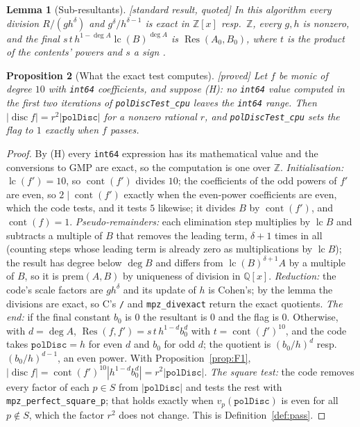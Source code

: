 \documentclass[10pt,a4paper]{article}
\newcommand{\Z}{\mathbb{Z}}
\newcommand{\Q}{\mathbb{Q}}
\DeclareMathOperator{\Res}{Res}
\DeclareMathOperator{\disc}{disc}
\DeclareMathOperator{\lc}{lc}
\DeclareMathOperator{\cont}{cont}
\newcommand{\code}[1]{\texttt{#1}}
\newcommand{\stproved}{\textsf{\small[proved]}\xspace}
\newcommand{\stquoted}{\textsf{\small[standard result, quoted]}\xspace}
\theoremstyle{plain}
\newtheorem{proposition}{Proposition}
\newtheorem{lemma}[proposition]{Lemma}
\theoremstyle{definition}
\begin{document}
\begin{lemma}[Sub-resultants]\stquoted
In this algorithm every division $R/(gh^\delta)$ and $g^\delta/h^{\delta-1}$ is exact in $\Z[x]$ resp.\ $\Z$, every $g,h$ is nonzero, and the final
$s\,t\,h^{1-\deg A}\lc(B)^{\deg A}$ is $\Res(A_0,B_0)$, where $t$ is the product of the contents' powers and $s$ a sign \cite[Section~3.3]{cohen}.
\end{lemma}

\begin{proposition}[What the exact test computes]\label{prop:poldisc}\stproved
Let $f$ be monic of degree $10$ with \code{int64} coefficients, and suppose (H): no \code{int64} value computed in the first two iterations of
\code{polDiscTest\_cpu} leaves the \code{int64} range.  Then $|\disc f|=r^2|\code{polDisc}|$ for a nonzero rational $r$, and \code{polDiscTest\_cpu} sets the flag
to $1$ exactly when $f$ passes.
\end{proposition}
\begin{proof}
By (H) every \code{int64} expression has its mathematical value and the conversions to GMP are exact, so the computation is one over $\Z$.
\emph{Initialisation:} $\lc(f')=10$, so $\cont(f')$ divides $10$; the coefficients of the odd powers of $f'$ are even, so $2\mid\cont(f')$ exactly when the even-power
coefficients are even, which the code tests, and it tests $5$ likewise; it divides $B$ by $\cont(f')$, and $\cont(f)=1$.
\emph{Pseudo-remainders:} each elimination step multiplies by $\lc B$ and subtracts a multiple of $B$ that removes the leading term, $\delta+1$ times in all
(counting steps whose leading term is already zero as multiplications by $\lc B$); the result has degree below $\deg B$ and differs from $\lc(B)^{\delta+1}A$ by a
multiple of $B$, so it is $\mathrm{prem}(A,B)$ by uniqueness of division in $\Q[x]$.
\emph{Reduction:} the code's scale factors are $gh^\delta$ and its update of $h$ is Cohen's; by the lemma the divisions are exact, so C's \code{/} and
\code{mpz\_divexact} return the exact quotients.
\emph{The end:} if the final constant $b_0$ is $0$ the resultant is $0$ and the flag is $0$.  Otherwise, with $d=\deg A$, $\Res(f,f')=s\,t\,h^{1-d}b_0^d$ with
$t=\cont(f')^{10}$, and the code takes $\code{polDisc}=h$ for even $d$ and $b_0$ for odd $d$; the quotient is $(b_0/h)^d$ resp.\ $(b_0/h)^{d-1}$, an even power.  With
Proposition~\ref{prop:F1}, $|\disc f|=\cont(f')^{10}|h^{1-d}b_0^d|=r^2|\code{polDisc}|$.
\emph{The square test:} the code removes every factor of each $p\in S$ from $|\code{polDisc}|$ and tests the rest with \code{mpz\_perfect\_square\_p}; that holds
exactly when $v_p(\code{polDisc})$ is even for all $p\notin S$, which the factor $r^2$ does not change.  This is Definition~\ref{def:pass}.
\end{proof}
\end{document}
